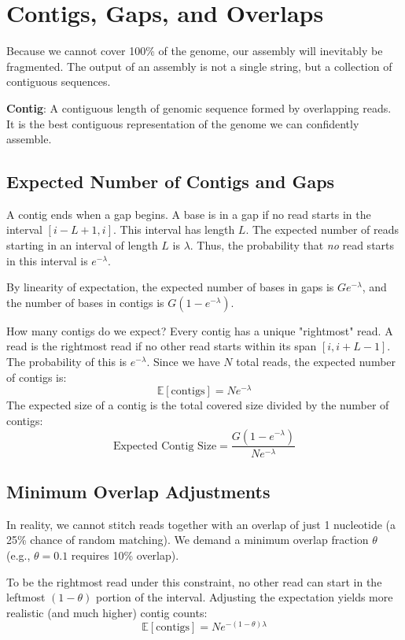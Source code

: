 \documentclass[11pt, a4paper]{article}
\begin{document}
\section{Contigs, Gaps, and Overlaps}
Because we cannot cover 100\% of the genome, our assembly will inevitably be fragmented. The output of an assembly is not a single string, but a collection of contiguous sequences.

\begin{important}
    \textbf{Contig}: A contiguous length of genomic sequence formed by overlapping reads. It is the best contiguous representation of the genome we can confidently assemble.
\end{important}

\subsection{Expected Number of Contigs and Gaps}
A contig ends when a gap begins. A base is in a gap if no read starts in the interval $[i - L + 1, i]$. This interval has length $L$. The expected number of reads starting in an interval of length $L$ is $\lambda$. Thus, the probability that \textit{no} read starts in this interval is $e^{-\lambda}$.

By linearity of expectation, the expected number of bases in gaps is $G e^{-\lambda}$, and the number of bases in contigs is $G(1 - e^{-\lambda})$.

How many contigs do we expect? Every contig has a unique "rightmost" read. A read is the rightmost read if no other read starts within its span $[i, i + L - 1]$. The probability of this is $e^{-\lambda}$. Since we have $N$ total reads, the expected number of contigs is:
\[ \mathbb{E}[\text{contigs}] = N e^{-\lambda} \]
The expected size of a contig is the total covered size divided by the number of contigs:
\[ \text{Expected Contig Size} = \frac{G(1 - e^{-\lambda})}{N e^{-\lambda}} \]

\subsection{Minimum Overlap Adjustments}
In reality, we cannot stitch reads together with an overlap of just 1 nucleotide (a 25\% chance of random matching). We demand a minimum overlap fraction $\theta$ (e.g., $\theta = 0.1$ requires 10\% overlap). 

To be the rightmost read under this constraint, no other read can start in the leftmost $(1-\theta)$ portion of the interval. Adjusting the expectation yields more realistic (and much higher) contig counts:
\[ \mathbb{E}[\text{contigs}] = N e^{-(1-\theta)\lambda} \]
\end{document}
